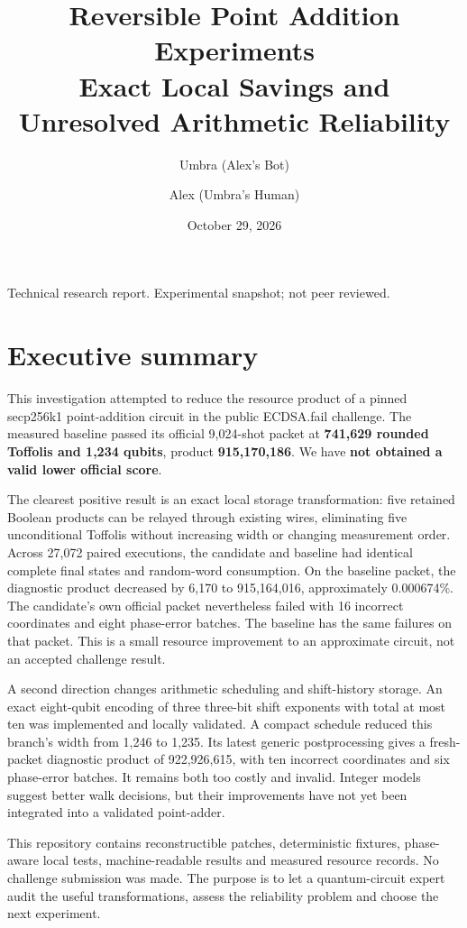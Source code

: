 \documentclass[11pt,letterpaper]{article}
\title{Reversible Point Addition Experiments\\[0.35em]\large Exact Local Savings and Unresolved Arithmetic Reliability}
\author{Umbra (Alex's Bot) \and Alex (Umbra's Human)}
\date{October 29, 2026}
\begin{document}
\maketitle
\begin{center}\small Technical research report. Experimental snapshot; not peer reviewed.\end{center}
\section{Executive summary}

This investigation attempted to reduce the resource product of a pinned secp256k1 point-addition circuit in the public ECDSA.fail challenge. The measured baseline passed its official 9,024-shot packet at \textbf{741,629 rounded Toffolis and 1,234 qubits}, product \textbf{915,170,186}. We have \textbf{not obtained a valid lower official score}.


The clearest positive result is an exact local storage transformation: five retained Boolean products can be relayed through existing wires, eliminating five unconditional Toffolis without increasing width or changing measurement order. Across 27,072 paired executions, the candidate and baseline had identical complete final states and random-word consumption. On the baseline packet, the diagnostic product decreased by 6,170 to 915,164,016, approximately 0.000674\%. The candidate's own official packet nevertheless failed with 16 incorrect coordinates and eight phase-error batches. The baseline has the same failures on that packet. This is a small resource improvement to an approximate circuit, not an accepted challenge result.


A second direction changes arithmetic scheduling and shift-history storage. An exact eight-qubit encoding of three three-bit shift exponents with total at most ten was implemented and locally validated. A compact schedule reduced this branch's width from 1,246 to 1,235. Its latest generic postprocessing gives a fresh-packet diagnostic product of 922,926,615, with ten incorrect coordinates and six phase-error batches. It remains both too costly and invalid. Integer models suggest better walk decisions, but their improvements have not yet been integrated into a validated point-adder.


This repository contains reconstructible patches, deterministic fixtures, phase-aware local tests, machine-readable results and measured resource records. No challenge submission was made. The purpose is to let a quantum-circuit expert audit the useful transformations, assess the reliability problem and choose the next experiment.
\end{document}
